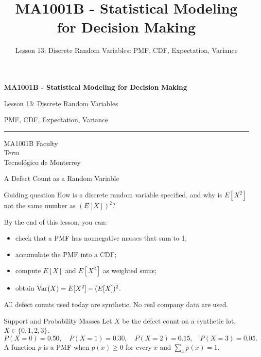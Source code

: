 \documentclass[aspectratio=169,10pt,english]{beamer}
\title{MA1001B - Statistical Modeling for Decision Making}
\subtitle{Lesson 13: Discrete Random Variables: PMF, CDF, Expectation, Variance}
\author{}
\institute{Tecnol\'ogico de Monterrey}
\date{}
\begin{document}
\begin{frame}[plain]
  \vspace{1.2cm}
  {\Large\bfseries MA1001B - Statistical Modeling for Decision Making\par}
  \vspace{0.7cm}
  {\large Lesson 13: Discrete Random Variables\par}
  \vspace{0.15cm}
  {\large PMF, CDF, Expectation, Variance\par}
  \vspace{0.7cm}
  {\color{TecRojo}\rule{\textwidth}{1.2pt}}
  \vspace{0.8cm}

  MA1001B Faculty\\[0.3cm]
  Term\\[0.3cm]
  Tecnol\'ogico de Monterrey
\end{frame}

\begin{frame}{A Defect Count as a Random Variable}
  \begin{alertblock}{Guiding question}
    How is a discrete random variable specified, and why is $E[X^2]$ not the
    same number as $(E[X])^2$?
  \end{alertblock}

  \vspace{0.6em}
  By the end of this lesson, you can:
  \begin{itemize}
    \item check that a PMF has nonnegative masses that sum to 1;
    \item accumulate the PMF into a CDF;
    \item compute $E[X]$ and $E[X^2]$ as weighted sums;
    \item obtain $\operatorname{Var}(X)=E[X^2]-(E[X])^2$.
  \end{itemize}

  \vfill
  \scriptsize All defect counts used today are synthetic. No real company data are used.
\end{frame}

\begin{frame}{Support and Probability Masses}
  \small
  Let $X$ be the defect count on a synthetic lot, $X\in\{0,1,2,3\}$.
  \[
    P(X=0)=0.50,\quad
    P(X=1)=0.30,\quad
    P(X=2)=0.15,\quad
    P(X=3)=0.05.
  \]
  A function $p$ is a PMF when $p(x)\ge 0$ for every $x$ and
  $\sum_x p(x)=1$.
\end{frame}
\end{document}
